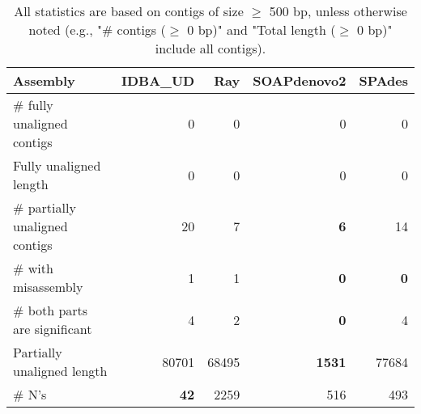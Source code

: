 \documentclass[12pt,a4paper]{article}
\begin{document}
\begin{table}[ht]
\begin{center}
\caption{All statistics are based on contigs of size $\geq$ 500 bp, unless otherwise noted (e.g., "\# contigs ($\geq$ 0 bp)" and "Total length ($\geq$ 0 bp)" include all contigs).}
\begin{tabular}{|l*{4}{|r}|}
\hline
Assembly & IDBA\_UD & Ray & SOAPdenovo2 & SPAdes \\ \hline
\# fully unaligned contigs & 0 & 0 & 0 & 0 \\ \hline
Fully unaligned length & 0 & 0 & 0 & 0 \\ \hline
\# partially unaligned contigs & 20 & 7 & {\bf 6} & 14 \\ \hline
\hspace{5mm}\# with misassembly & 1 & 1 & {\bf 0} & {\bf 0} \\ \hline
\hspace{5mm}\# both parts are significant & 4 & 2 & {\bf 0} & 4 \\ \hline
Partially unaligned length & 80701 & 68495 & {\bf 1531} & 77684 \\ \hline
\# N's & {\bf 42} & 2259 & 516 & 493 \\ \hline
\end{tabular}
\end{center}
\end{table}
\end{document}

